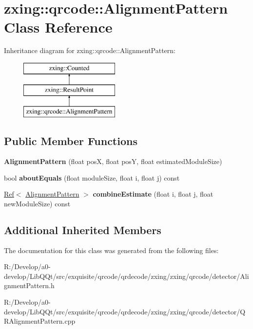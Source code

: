\hypertarget{classzxing_1_1qrcode_1_1_alignment_pattern}{}\section{zxing\+:\+:qrcode\+:\+:Alignment\+Pattern Class Reference}
\label{classzxing_1_1qrcode_1_1_alignment_pattern}
Inheritance diagram for zxing\+:\+:qrcode\+:\+:Alignment\+Pattern\+:\begin{figure}[H]
\begin{center}
\leavevmode
\includegraphics[height=3.000000cm]{classzxing_1_1qrcode_1_1_alignment_pattern}
\end{center}
\end{figure}
\subsection*{Public Member Functions}
\begin{DoxyCompactItemize}
\item 
\mbox{\label{classzxing_1_1qrcode_1_1_alignment_pattern_a9f5776c29e3d7b9700e30174288c8278}} 
{\bfseries Alignment\+Pattern} (float posX, float posY, float estimated\+Module\+Size)
\item 
\mbox{\label{classzxing_1_1qrcode_1_1_alignment_pattern_a7d222918d7bca2c2bfb06b2c6acb98d9}} 
bool {\bfseries about\+Equals} (float module\+Size, float i, float j) const
\item 
\mbox{\label{classzxing_1_1qrcode_1_1_alignment_pattern_a6b9353ca0698c05099241560841fff4f}} 
\mbox{\hyperlink{classzxing_1_1_ref}{Ref}}$<$ \mbox{\hyperlink{classzxing_1_1qrcode_1_1_alignment_pattern}{Alignment\+Pattern}} $>$ {\bfseries combine\+Estimate} (float i, float j, float new\+Module\+Size) const
\end{DoxyCompactItemize}
\subsection*{Additional Inherited Members}


The documentation for this class was generated from the following files\+:\begin{DoxyCompactItemize}
\item 
R\+:/\+Develop/a0-\/develop/\+Lib\+Q\+Qt/src/exquisite/qrcode/qrdecode/zxing/zxing/qrcode/detector/Alignment\+Pattern.\+h\item 
R\+:/\+Develop/a0-\/develop/\+Lib\+Q\+Qt/src/exquisite/qrcode/qrdecode/zxing/zxing/qrcode/detector/Q\+R\+Alignment\+Pattern.\+cpp\end{DoxyCompactItemize}
